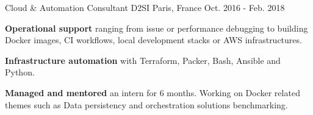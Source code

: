 \begin{cventries}
  \cventry
    {Cloud \& Automation Consultant} %
    {D2SI} %
    {Paris, France} %
    {Oct. 2016 - Feb. 2018} %
    {
      \begin{cvitems} %
        \item {\textbf{Operational support} ranging from issue or performance debugging to building Docker images, CI workflows, local development stacks or AWS infrastructures.}
        \item {\textbf{Infrastructure automation} with Terraform, Packer, Bash, Ansible and Python.}
        \item {\textbf{Managed and mentored} an intern for 6 months. Working on Docker related themes such as Data persistency and orchestration solutions benchmarking.}
      \end{cvitems}
    }



\end{cventries}
